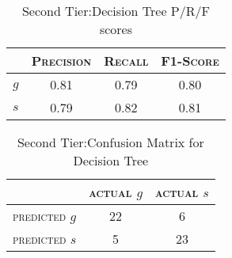 \begin{table}[h]
	\center
	\begin{tabular}{ c | c  c  c }
		& \textsc{Precision} & \textsc{Recall} & \textsc{F1-Score} \\
		\hline
		\textsc{$g$} 	& 0.81 & 0.79 & 0.80 \\
		\textsc{$s$}	& 0.79 & 0.82 & 0.81
	\end{tabular}
	\caption{Second Tier:Decision Tree P/R/F scores}
\end{table}

\begin{table}[h]
	\center
	\begin{tabular}{ c | c  c }
		 & \textsc{actual $g$} & \textsc{actual $s$} \\
		\hline
		\textsc{predicted $g$} 	& 22 & 6 \\
		\textsc{predicted $s$}		& 5 & 23
	\end{tabular}
	\caption{Second Tier:Confusion Matrix for Decision Tree}
\end{table}